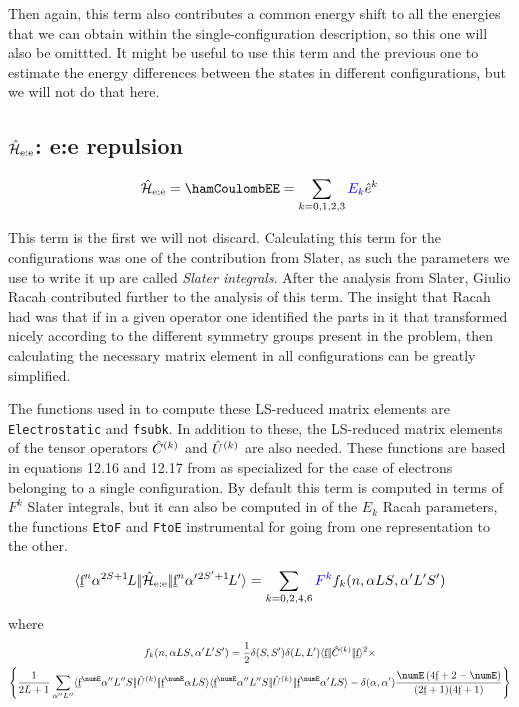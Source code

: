 \documentclass{article}
\newcommand{\codetext}[1]{{\color{BlueViolet} \texttt{#1}}}
\begin{document}
Then again, this term also contributes a common energy shift to all the energies that we can obtain within the single-configuration description, so this one will also be omittted. It might be useful to use this term and the previous one to estimate the energy differences between the states in different configurations, but we will not do that here.

\subsection{$\hat{\mathcal{H}}_\text{e:e}$: e:e repulsion}
 
\begin{equation}
    \hamCoulombEESymbol = \hamCoulombEE = \sum_{k=0,1,2,3} \Ek \hat{e}^k 
\end{equation}  

This term is the first we will not discard. Calculating this term for the \fn configurations was one of the contribution from Slater, as such the parameters we use to write it up are called \textit{Slater integrals}. After the analysis from Slater, Giulio Racah contributed further to the analysis of this term. The insight that Racah had was that if in a given operator one identified the parts in it that transformed nicely according to the different symmetry groups present in the problem, then calculating the necessary matrix element in all \fn configurations can   be greatly simplified.

The functions used in \ql to compute these LS-reduced matrix elements are \codetext{Electrostatic} and \codetext{fsubk}. In addition to these, the LS-reduced matrix elements of the tensor operators $\hat{C}^{(k)}$ and $\hat{U}^{(k)}$ are also needed. These functions are based in equations 12.16 and 12.17 from \cowan  as specialized for the case of electrons belonging to a single \fn configuration. By default this term is computed in terms of $F^k$ Slater integrals, but it can also be computed in of the $E_k$ Racah parameters, the functions \codetext{EtoF} and \codetext{FtoE} instrumental for going from one representation to the other.
 
\begin{equation}
\langle \underbar{$\text{f}$}^n\alpha{}^{2S+1}{\kern-0.1em}{L}|\!|\hat{\mathcal{H}}_\text{e:e}|\!|\underbar{$\text{f}$}^n\alpha'{}^{2S'+1}{\kern-0.1em}{L'}\rangle = \sum_{k=0,2,4,6} \textcolor{blue}{{F^k}} f_k(n,\alpha{LS},\alpha'{L'S'})
\end{equation} 
where
\begin{multline}
    f_k(n,\alpha{LS},\alpha'{L'S'}) = \frac{1}{2} 
        \kronecker{S}{S'}
        \kronecker{L}{L'}
        \redbraopket{\forb}
            {\op{C}^{(k)}}
            {\forb}^2 \times \\
        \left\{ 
            \frac{1}{\tpo{L}} \sum_{\alpha''L''} 
                \redbraopket{\forb^\numE \alpha'' L'' S}
                    {\op{U}^{(k)}}
                    {\forb^\numE \alpha L S} 
            \redbraopket{\forb^\numE \alpha'' L'' S}
                {\op{U}^{(k)}} 
                {\forb^\numE \alpha' L S}
            - \kronecker{\alpha}{\alpha'}
                \frac{\numE \left(4 \forb + 2 - \numE\right)}
                    {(\tpo{\forb})(4 \forb + 1)} 
        \right\}
\end{multline}      
\end{document}
